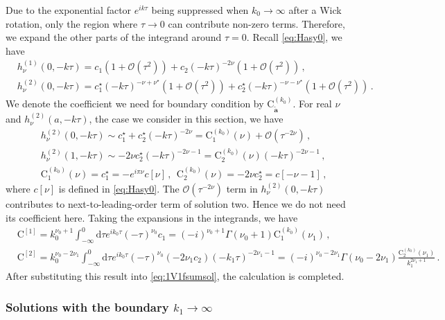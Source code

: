 \documentclass[a4paper,11pt]{article}
\newcommand{\nn}{\nonumber}
\newcommand{\nd}{\mathrm{d}}
\begin{document}
Due to the exponential factor \( e^{ik\tau} \) being suppressed when \( k_0 \to \infty \) after a Wick rotation, only the region where \( \tau \to 0 \) can contribute non-zero terms. Therefore, we expand the other parts of the integrand around \( \tau = 0 \).
Recall \eqref{eq:Hasy0}, we have
\begin{align}
&h_\nu^{(1)}(0,-k\tau)=c_1 (1+\mathcal{O}(\tau^2)) +  c_2 (-k\tau)^{-2\nu} (1+\mathcal{O}(\tau^2)) \, , \nn\\
&h_\nu^{(2)}(0,-k\tau)=c_1^{\star} (-k\tau)^{-\nu+\nu^\star}(1+\mathcal{O}(\tau^2)) +  c_2^{\star} (-k\tau)^{-\nu-\nu^\star} (1+\mathcal{O}(\tau^2)) \, . \label{eq:asyhRInu}
\end{align}
We denote the coefficient we need for boundary condition by $\text{C}_{\tilde{\bm{a}}}^{(k_0)}$.
For real $\nu$ and $h^{(2)}_\nu(a,-k\tau)$, the case we consider in this section, we have
\begin{align}
&h_{\nu}^{(2)}(0,-k\tau)\sim c_1^\star +  c_2^\star (-k\tau)^{-2\nu}  = \text{C}_1^{(k_0)}(\nu)  +  \mathcal{O}(\tau^{-2\nu})   \, , \nn\\
&h_{\nu}^{(2)}(1,-k\tau)\sim-2\nu c_2^\star (-k\tau)^{-2\nu-1}=\text{C}_2^{(k_0)}(\nu) (-k\tau)^{-2\nu-1}\, ,\nn\\
&\text{C}_1^{(k_0)}(\nu) = c_1^\star=-e^{i\pi\nu}c[\nu] \, , ~~\text{C}_2^{(k_0)}(\nu) = -2\nu c_2^\star=c[-\nu-1] \, , \label{eq:expandha2R}
\end{align}
where $c[\nu]$ is defined in  \eqref{eq:Hasy0}. The $\mathcal{O}(\tau^{-2\nu})$ term in $h_\nu^{(2)}(0,-k\tau)$ contributes to next-to-leading-order term of solution two. Hence we do not need its coefficient here.
Taking the expansions in the integrands,  we have 
\begin{align}
& \text{C}^{[1]}=k_0^{\nu_0+1}\int_{-\infty}^0 \nd \tau e^{ i k_0 \tau} (-\tau)^{\nu_0} c_{1} = (-i)^{\nu_0+1} \Gamma \left(\nu_0+1\right) \text{C}_1^{(k_0)}(\nu_1) \, , \nn\\
& \text{C}^{[2]}=k_0^{\nu_0-2\nu_1}\int_{-\infty}^0 \nd \tau e^{ i k_0 \tau} (-\tau)^{\nu_0} (-2 \nu_1 c_{2})(-k_1 \tau)^{-2\nu_1-1} =(-i)^{\nu_0-2\nu_1}  \Gamma \left(\nu _0-2 \nu _1\right) \frac{ \text{C}_2^{(k_0)}(\nu_1)}{k_1^{2 \nu _1+1}} \,.
\end{align}
After substituting this result into \eqref{eq:1V1fsumsol},  the calculation is completed.


\subsubsection{Solutions with the boundary $k_1\to \infty$}\label{sec:1v1fk1inf}
\end{document}
